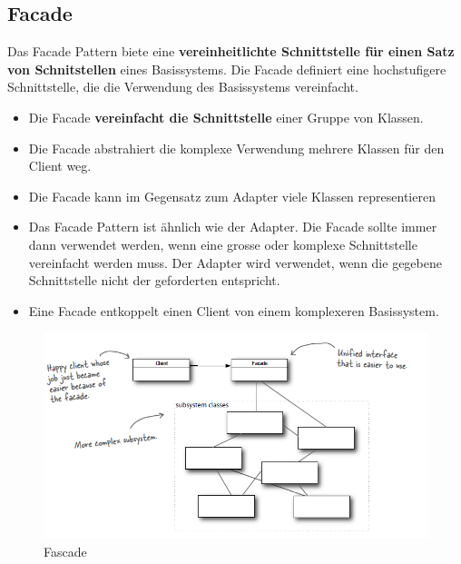\clearpage

\subsection{Facade}
\label{sec:facade}
Das Facade Pattern biete eine \textbf{vereinheitlichte Schnittstelle für einen Satz von Schnitstellen} eines Basissystems. Die Facade definiert eine hochstufigere Schnittstelle, die die Verwendung des Basissystems vereinfacht. 

\begin{itemize}
	\item Die Facade \textbf{vereinfacht die Schnittstelle} einer Gruppe von Klassen. 
	\item Die Facade abstrahiert die komplexe Verwendung mehrere Klassen für den Client weg.
	\item Die Facade kann im Gegensatz zum Adapter viele Klassen representieren
	\item Das Facade Pattern ist ähnlich wie der Adapter. Die Facade sollte immer dann verwendet werden, wenn eine grosse oder komplexe Schnittstelle vereinfacht werden muss. Der Adapter wird verwendet, wenn die gegebene Schnittstelle nicht der geforderten entspricht.
	\item Eine Facade entkoppelt einen Client von einem komplexeren Basissystem.
\end{itemize}

\begin{figure}[h]
	\centering
	\includegraphics[width=0.9\linewidth]{images/fascade_pattern}
	\caption{Fascade}
	\label{fig:fascadepattern}
\end{figure}

\clearpage

